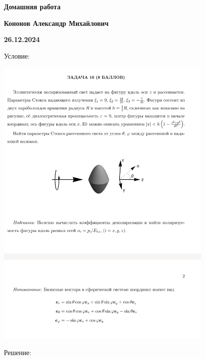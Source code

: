 \documentclass[12pt]{article}
\begin{document}
\begin{large}
\begin{center}
\LARGE \textbf{Домашняя работа}
\par
\LARGE \textbf{Кононов Александр Михайлович}
\par
    \textbf{26.12.2024}
\end{center}
\par Условие:
\par
\includegraphics[width=0.8\textwidth]{photo.png}
\par Решение:
\par
\par

\end{large}
\end{document}
